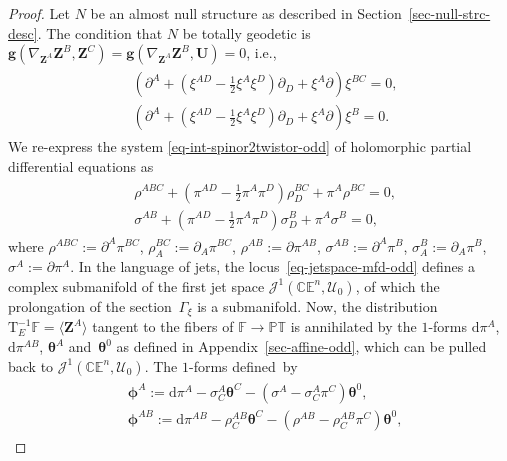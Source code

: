 \documentclass[pdftex]{sigma}
\numberwithin{equation}{section}
\newcommand{\mc} [1]{\mathcal{#1}}
\newcommand{\dd} {\mathrm{d}}
\newcommand{\Tgt} {\mathrm{T}}
\newcommand{\PT} {\mathbb{PT}}
\newcommand{\E} {\mathbb{E}}
\newcommand{\C} {\mathbb{C}}
\newcommand{\F} {\mathbb{F}}
\begin{document}
\begin{proof}Let $N$ be an almost null structure as described in Section~\ref{sec-null-strc-desc}. The condition that $N$ be totally geodetic is $\bm{g} ( \nabla_{\bm{Z}^{A}} \bm{Z}^{B} , \bm{Z}^{C} ) = \bm{g} ( \nabla_{\bm{Z}^{A}} \bm{Z}^{B} , \bm{U} ) = 0$, i.e.,
\begin{gather}\label{eq-int-spinor2twistor-odd}\begin{split}
& \left( \partial ^{A} + \left( \xi^{AD} - \tfrac{1}{2} \xi^{A} \xi^{D} \right) \partial _{D} + \xi^{A} \partial \right) \xi^{BC} = 0 , \\
& \left( \partial ^{A} + \left( \xi^{AD} - \tfrac{1}{2} \xi^{A} \xi^{D} \right) \partial _{D} + \xi^{A} \partial \right) \xi^{B} = 0 .
\end{split}
\end{gather}
We re-express the system \eqref{eq-int-spinor2twistor-odd} of holomorphic partial dif\/ferential equations as
\begin{gather}\label{eq-jetspace-mfd-odd}
\begin{split}
& \rho^{ABC} + \left( \pi^{AD} - \tfrac{1}{2} \pi^{A} \pi^{D} \right) \rho_{D}^{BC} + \pi^{A} \rho^{BC} = 0 , \\
& \sigma^{AB} + \left( \pi^{AD} - \tfrac{1}{2} \pi^{A} \pi^{D} \right) \sigma_{D}^{B} + \pi^{A} \sigma^{B} = 0 ,
\end{split}
\end{gather}
where $\rho^{ABC}:=\partial^{A} \pi^{BC} $, $\rho_{A}^{BC} :=\partial_{A} \pi^{BC}$, $\rho^{AB}:=\partial \pi^{AB}$, $\sigma^{AB}:=\partial^{A} \pi^{B}$, $\sigma_{A}^{B} :=\partial_{A} \pi^{B}$, $\sigma^{A}:=\partial \pi^{A}$. In the language of jets, the locus~\eqref{eq-jetspace-mfd-odd} def\/ines a complex submanifold of the f\/irst jet space $\mc{J}^1 (\C \E^n,\mc{U}_0)$, of which the prolongation of the section~$\Gamma_\xi$ is a submanifold. Now, the distribution $\Tgt^{-1}_E \F = \langle \bm{Z}^A \rangle$ tangent to the f\/ibers of $\F \rightarrow \PT$ is annihilated by the $1$-forms $\dd \pi^A$, $\dd \pi^{AB}$, $\bm{\theta}^A$ and~$\bm{\theta}^0$ as def\/ined in Appendix~\ref{sec-affine-odd}, which can be pulled back to $\mc{J}^1 (\C \E^n,\mc{U}_0)$. The $1$-forms def\/ined~by
\begin{gather}
\begin{split}
& \bm{\phi}^A := \dd \pi^{A} - \sigma_{C}^{A} \bm{\theta}^C - \left( \sigma^{A} - \sigma_{C}^{A} \pi^{C} \right) \bm{\theta}^0 , \\
& \bm{\phi}^{AB} := \dd \pi^{AB} - \rho_{C}^{AB} \bm{\theta}^C - \left( \rho^{AB} - \rho_{C}^{AB} \pi^C \right) \bm{\theta}^0 ,

\end{split}
\end{gather}
\end{proof}
\end{document}
